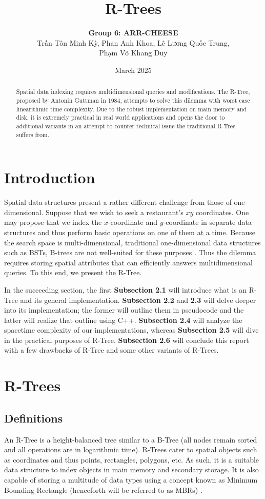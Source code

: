 \documentclass{article}
\title{R-Trees}
\author{\textbf{Group 6: ARR-CHEESE}\\\foreignlanguage{vietnamese}{Trần Tôn Minh Kỳ, Phan Anh Khoa, Lê Lương Quốc Trung,}\\\foreignlanguage{vietnamese}{Phạm Võ Khang Duy}}
\date{March 2025}
\begin{document}
\maketitle

\begin{abstract}
    Spatial data indexing requires multidimensional queries and modifications. The R-Tree, proposed by Antonin Guttman in 1984, attempts to solve this dilemma with worst case linearithmic time complexity. Due to the robust implementation on main memory and disk, it is extremely practical in real world applications and opens the door to additional variants in an attempt to counter technical issue the traditional R-Tree suffers from.
\end{abstract}

\tableofcontents

\newpage
\section{Introduction}
Spatial data structures present a rather different challenge from those of one-dimensional. Suppose that we wish to seek a restaurant's $xy$ coordinates. One may propose that we index the $x$-coordinate and $y$-coordinate in separate data structures and thus perform basic operations on one of them at a time. Because the search space is multi-dimensional, traditional one-dimensional data structures such as BSTs, B-trees are not well-suited for these purposes \cite{Guttman1984}. Thus the dilemma requires storing spatial attributes that can efficiently answers multidimensional queries. To this end, we present the R-Tree.

In the succeeding section, the first \textbf{Subsection 2.1} will introduce what is an R-Tree and its general implementation. \textbf{Subsection 2.2} and \textbf{2.3} will delve deeper into its implementation; the former will outline them in pseudocode and the latter will realize that outline using C++. \textbf{Subsection 2.4} will analyze the spacetime complexity of our implementations, whereas \textbf{Subsection 2.5} will dive in the practical purposes of R-Tree. \textbf{Subsection 2.6} will conclude this report with a few drawbacks of R-Tree and some other variants of R-Trees.

\section{R-Trees}
\subsection{Definitions}
An R-Tree is a height-balanced tree similar to a B-Tree \cite{Guttman1984} (all nodes remain sorted and all operations are in logarithmic time). R-Trees cater to spatial objects such as coordinates and thus points, rectangles, polygons, etc. As such, it is a suitable data structure to index objects in main memory and secondary storage. It is also capable of storing a multitude of data types using a concept known as Minimum Bounding Rectangle (henceforth will be referred to as MBRs) \cite{Papadopoulos2018}.
\end{document}
